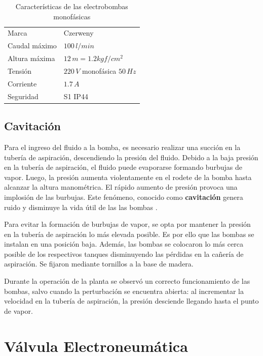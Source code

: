\begin{table}[ht]
\renewcommand{\arraystretch}{1.3}
\centering
\begin{tabular}{|l|l|}
\hline
Marca & Czerweny\\
Caudal máximo &  $100\,l/min$\\
Altura máxima &  $12\,m = 1.2 kgf/cm^2$\\
Tensión & $220\,V$ monofásica $50\,Hz$\\
Corriente & $1.7\,A$\\
Seguridad & S1 IP44\\
\hline
\end{tabular}
\caption{Características de las electrobombas monofásicas}
\label{tab:caractBombas}
\end{table}

\subsection{Cavitación}
\label{subsec:cavitacion}
Para el ingreso del fluido a la bomba, es necesario realizar una succión
en la tubería de aspiración, descendiendo la presión del fluido.
Debido a la baja presión en la tubería de aspiración, el fluido puede
evaporarse formando burbujas de vapor.
Luego, la presión aumenta violentamente en el rodete de la bomba hasta alcanzar
la altura manométrica.
El rápido aumento de presión provoca una implosión de las burbujas.
Este fenómeno, conocido como \textbf{cavitación} genera ruido y disminuye la
vida útil de las las bombas \cite{bib:ApuntesMDFBombas}.

Para evitar la formación de burbujas de vapor, se opta por mantener la presión
en la tubería de aspiración lo más elevada posible.
Es por ello que las bombas se instalan en una posición baja.
Además, las bombas se colocaron lo más cerca posible de los respectivos
tanques disminuyendo las pérdidas en la cañería de aspiración.
Se fijaron mediante tornillos a la base de madera.

Durante la operación de la planta se observó un correcto funcionamiento de las
bombas, salvo cuando la perturbación se encuentra abierta: al incrementar la
velocidad en la tubería de aspiración, la presión desciende llegando hasta el
punto de vapor.

\section{Válvula Electroneumática}
\label{sec:ValvulaNeumatica}

